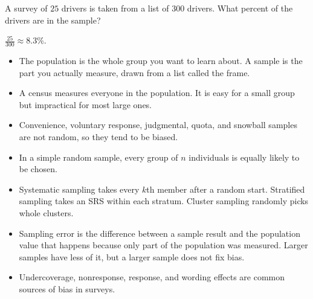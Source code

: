 \begin{Exercise}[title={Sample Fraction}, label=samp6]
A survey of $25$ drivers is taken from a list of $300$ drivers. What percent of the drivers are in the sample?
\end{Exercise}
\begin{Answer}[ref=samp6]
$\frac{25}{300} \approx 8.3\%$.
\end{Answer}

\begin{mdframed}[style=important, frametitle={Key Ideas}]
\begin{itemize}
\item The population is the whole group you want to learn about. A sample is the part you actually measure, drawn from a list called the frame.
\item A census measures everyone in the population. It is easy for a small group but impractical for most large ones.
\item Convenience, voluntary response, judgmental, quota, and snowball samples are not random, so they tend to be biased.
\item In a simple random sample, every group of $n$ individuals is equally likely to be chosen.
\item Systematic sampling takes every $k$th member after a random start. Stratified sampling takes an SRS within each stratum. Cluster sampling randomly picks whole clusters.
\item Sampling error is the difference between a sample result and the population value that happens because only part of the population was measured. Larger samples have less of it, but a larger sample does not fix bias.
\item Undercoverage, nonresponse, response, and wording effects are common sources of bias in surveys.
\end{itemize}
\end{mdframed}

